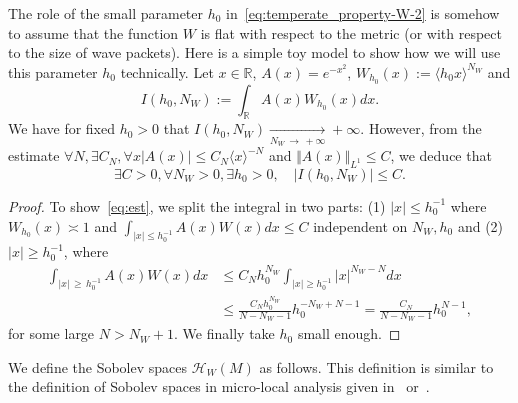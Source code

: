 \documentclass[AHL,Unicode,longabstracts,published]{cedram}
\newcommand{\clH}{\mathcal{H}}
\newcommand{\bbR}{\mathbb{R}}
\let\oldexists\exists
\renewcommand*{\exists}{\mathrel{\oldexists}}
\let\oldforall\forall
\renewcommand*{\forall}{\mathrel{\oldforall}}
\newcommand{\clH}{\mathcal{H}}
\newcommand{\bbR}{\mathbb{R}}
\begin{document}
\begin{rema}\label{rem:h0-model}
The role of the small parameter $h_{0}$ in~\eqref{eq:temperate_property-W-2} is somehow to assume that the function $W$ is flat with respect to the metric (or with respect to the size of wave packets). Here is a simple toy model to show how we will use this parameter $h_{0}$ technically. Let $x\in\bbR$, $A(x)=e^{-x^{2}}$, $W_{h_{0}}(x):=\langle h_{0}x\rangle ^{N_{W}}$ and
\[
I\left(h_{0},N_{W}\right):=\int_{\bbR}A\left(x\right)W_{h_{0}}\left(x\right)dx.
\]
We have for fixed $h_{0}>0$ that $I(h_{0},N_{W})\underset{N_{W}\,\rightarrow\,+\infty}{\rightarrow}+\infty$. However, from the estimate $\forall N,\exists C_{N},\forall x|A(x)|\leq C_{N}\langle x\rangle ^{-N}$ and $\Vert A(x)\Vert _{L^{1}}\leq C$, we deduce that
\begin{equation}
\exists C>0,\forall N_{W}>0,\exists h_{0}>0,\quad\left|I\left(h_{0},N_{W}\right)\right|\leq C.\label{eq:est}
\end{equation}
\begin{proof}
To show~\eqref{eq:est}, we split the integral in two parts: (1) $|x|\leq h_{0}^{-1}$ where $W_{h_{0}}(x){\asymp}1$ and $\int_{|x|\leq h_{0}^{-1}}A(x)W(x)dx\leq C$ independent on $N_{W},h_{0}$ and (2) $|x|\geq h_{0}^{-1}$, where
\begin{align*}
\int_{\left|x\right|\,\geq\,h_{0}^{-1}}A\left(x\right)W\left(x\right)dx & \leq C_{N}h_{0}^{N_{W}}\int_{\left|x\right|\geq h_{0}^{-1}}\left|x\right|^{N_{W}-N}dx\\
& \leq\frac{C_{N}h_{0}^{N_{W}}}{N-N_{W}-1}h_{0}^{-N_{W}+N-1}=\frac{C_{N}}{N-N_{W}-1}h_{0}^{N-1},
\end{align*}
for some large $N>N_{W}+1$. We finally take $h_{0}$ small enough.
\end{proof}
\end{rema}



We define the Sobolev spaces $\clH _{W}(M)$ as follows. This definition is similar to the definition of Sobolev spaces in micro-local analysis given in~\cite[Defi.2.6.1]{lerner2011metrics} or~\cite[Section~1.7.4]{nicola_rodino_livre_11}.
\end{document}

